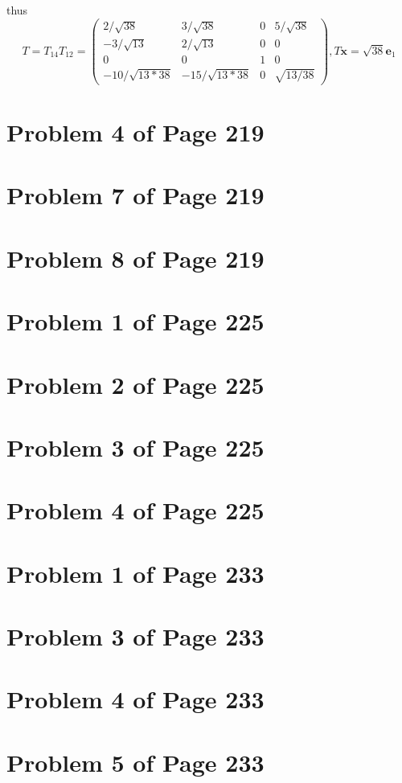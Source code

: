 \documentclass[12pt,a4paper]{article}
\newcommand{\mysection}[2]{
\section{Problem #1 of Page #2}	
	}
\begin{document}
thus
\[
	T = T_{14}T_{12} = \left(\begin{array}{cccc}  
	2/\sqrt{38} & 3/\sqrt{38} & 0 & 5/\sqrt{38} \\
	-3/\sqrt{13} & 2/\sqrt{13} & 0 & 0 \\
	0 & 0 &1 &0 \\
	-10/\sqrt{13*38} & -15/\sqrt{13*38} & 0 & \sqrt{13/38} 
	\end{array} \right) ,
	T\bm{x} = \sqrt{38}\bm{e}_1
\]
\mysection{4}{219}

\mysection{7}{219}

\mysection{8}{219}

\mysection{1}{225}

\mysection{2}{225}

\mysection{3}{225}

\mysection{4}{225}

\mysection{1}{233}

\mysection{3}{233}

\mysection{4}{233}

\mysection{5}{233} 
\end{document}
